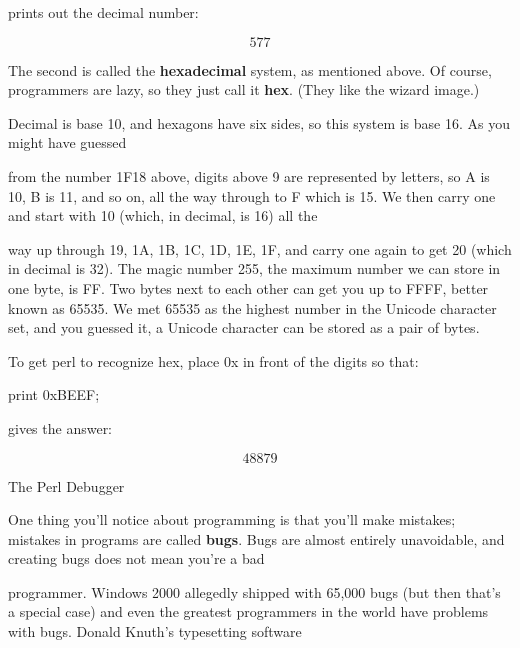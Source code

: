 \documentclass[a4paper,11pt]{book}
\begin{document}
\noindent 

\noindent prints out the decimal number:

\noindent 

\[577\] 


\noindent The second is called the \textbf{hexadecimal }system, as mentioned above. Of course, programmers are lazy, so they just call it \textbf{hex}. (They like the wizard image.)

\noindent 

\noindent 

\noindent Decimal is base 10, and hexagons have six sides, so this system is base 16. As you might have guessed

\noindent from the number 1F18 above, digits above 9 are represented by letters, so A is 10, B is 11, and so on, all the way through to F which is 15. We then carry one and start with 10 (which, in decimal, is 16) all the

\noindent way up through 19, 1A, 1B, 1C, 1D, 1E, 1F, and carry one again to get 20 (which in decimal is 32). The magic number 255, the maximum number we can store in one byte, is FF. Two bytes next to each other can get you up to FFFF, better known as 65535. We met 65535 as the highest number in the Unicode character set, and you guessed it, a Unicode character can be stored as a pair of bytes.

\noindent 

\noindent To get perl to recognize hex, place 0x in front of the digits so that:

\noindent 

\noindent 

\noindent print 0xBEEF;

\noindent 

\noindent gives the answer:

\noindent 

\[48879\] 


\noindent 

\noindent The Perl Debugger

\noindent 

\noindent One thing you'll notice about programming is that you'll make mistakes; mistakes in programs are called \textbf{bugs}. Bugs are almost entirely unavoidable, and creating bugs does not mean you're a bad

\noindent programmer. Windows 2000 allegedly shipped with 65,000 bugs (but then that's a special case) and even the greatest programmers in the world have problems with bugs. Donald Knuth's typesetting software
\end{document}
